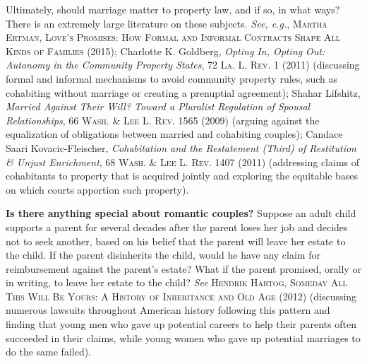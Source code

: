\item Ultimately, should marriage matter to property law, and if so, in what
ways? There is an extremely large literature on these subjects. \textit{See,
e.g.}, \textsc{Martha Ertman, Love's Promises: How Formal and Informal Contracts
Shape All Kinds of Families} (2015); Charlotte K. Goldberg, \emph{Opting In,
Opting Out: Autonomy in the Community Property States}, 72 \textsc{La. L. Rev.}
1 (2011) (discussing formal and informal mechanisms to avoid community property
rules, such as cohabiting without marriage or creating a prenuptial agreement);
Shahar Lifshitz, \emph{Married Against Their Will? Toward a Pluralist Regulation
of Spousal Relationships}, 66 \textsc{Wash. \& Lee L. Rev.} 1565 (2009) (arguing
against the equalization of obligations between married and cohabiting couples);
Candace Saari Kovacic-Fleischer, \emph{Cohabitation and the Restatement (Third)
of Restitution \& Unjust Enrichment}, 68 \textsc{Wash. \& Lee L. Rev.} 1407
(2011) (addressing claims of cohabitants to property that is acquired jointly
and exploring the equitable bases on which courts apportion such property).

\item
\textbf{Is there anything special about romantic couples?} Suppose an adult
child supports a parent for several decades after the parent loses her job and
decides not to seek another, based on his belief that the parent will leave her
estate to the child. If the parent disinherits the child, would he have any
claim for reimbursement against the parent's estate? What if the parent
promised, orally or in writing, to leave her estate to the child? \textit{See}
\textsc{Hendrik Hartog, Someday All This Will Be Yours: A History of Inheritance
and Old Age} (2012) (discussing numerous lawsuits throughout American history
following this pattern and finding that young men who gave up potential careers
to help their parents often succeeded in their claims, while young women who
gave up potential marriages to do the same failed).

